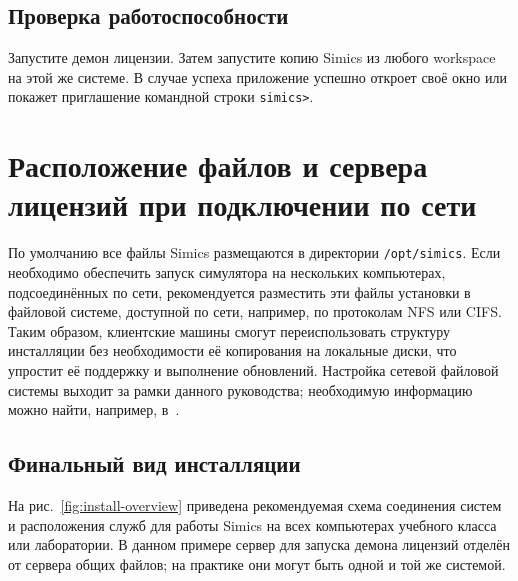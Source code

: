 \subsection{Проверка работоспособности}

Запустите демон лицензии. Затем запустите копию Simics из любого workspace на этой же системе. В случае успеха приложение успешно откроет своё окно или покажет приглашение командной строки \texttt{simics>}.

\section{Расположение файлов и сервера лицензий при подключении по сети}

По умолчанию все файлы Simics размещаются в директории \texttt{/opt/simics}. Если необходимо обеспечить запуск симулятора на нескольких компьютерах, подсоединённых по сети, рекомендуется разместить эти файлы установки в файловой системе, доступной по сети, например, по протоколам NFS или CIFS. Таким образом, клиентские машины смогут переиспользовать структуру инсталляции без необходимости её копирования на локальные диски, что упростит её поддержку и выполнение обновлений. Настройка сетевой файловой системы выходит за рамки данного руководства; необходимую информацию можно найти, например, в~\cite{nfs}.

\subsection{Финальный вид инсталляции}

На рис.~\ref{fig:install-overview} приведена рекомендуемая схема соединения систем и расположения служб для работы Simics на всех компьютерах учебного класса или лаборатории. В данном примере сервер для запуска демона лицензий отделён от сервера общих файлов; на практике они могут быть одной и той же системой.

